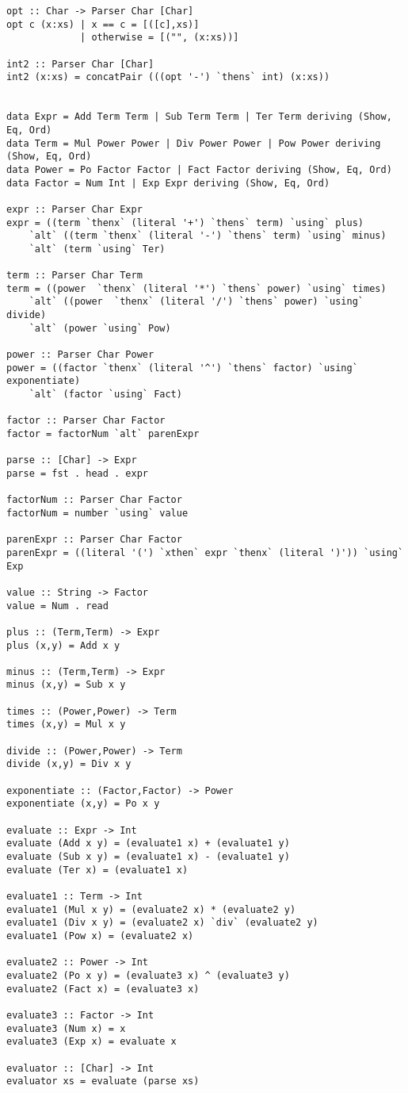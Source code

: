 \documentclass[11pt]{article}
\begin{document}
\begin{verbatim}
opt :: Char -> Parser Char [Char]
opt c (x:xs) | x == c = [([c],xs)]
             | otherwise = [("", (x:xs))]

int2 :: Parser Char [Char]
int2 (x:xs) = concatPair (((opt '-') `thens` int) (x:xs))


data Expr = Add Term Term | Sub Term Term | Ter Term deriving (Show, Eq, Ord)
data Term = Mul Power Power | Div Power Power | Pow Power deriving (Show, Eq, Ord)
data Power = Po Factor Factor | Fact Factor deriving (Show, Eq, Ord)
data Factor = Num Int | Exp Expr deriving (Show, Eq, Ord)

expr :: Parser Char Expr
expr = ((term `thenx` (literal '+') `thens` term) `using` plus) 
    `alt` ((term `thenx` (literal '-') `thens` term) `using` minus) 
    `alt` (term `using` Ter) 

term :: Parser Char Term
term = ((power  `thenx` (literal '*') `thens` power) `using` times) 
    `alt` ((power  `thenx` (literal '/') `thens` power) `using` divide) 
    `alt` (power `using` Pow)

power :: Parser Char Power
power = ((factor `thenx` (literal '^') `thens` factor) `using` exponentiate)
    `alt` (factor `using` Fact)

factor :: Parser Char Factor
factor = factorNum `alt` parenExpr

parse :: [Char] -> Expr
parse = fst . head . expr

factorNum :: Parser Char Factor
factorNum = number `using` value

parenExpr :: Parser Char Factor
parenExpr = ((literal '(') `xthen` expr `thenx` (literal ')')) `using` Exp

value :: String -> Factor
value = Num . read

plus :: (Term,Term) -> Expr
plus (x,y) = Add x y

minus :: (Term,Term) -> Expr
minus (x,y) = Sub x y

times :: (Power,Power) -> Term
times (x,y) = Mul x y

divide :: (Power,Power) -> Term
divide (x,y) = Div x y

exponentiate :: (Factor,Factor) -> Power
exponentiate (x,y) = Po x y

evaluate :: Expr -> Int
evaluate (Add x y) = (evaluate1 x) + (evaluate1 y)
evaluate (Sub x y) = (evaluate1 x) - (evaluate1 y)
evaluate (Ter x) = (evaluate1 x)

evaluate1 :: Term -> Int
evaluate1 (Mul x y) = (evaluate2 x) * (evaluate2 y)
evaluate1 (Div x y) = (evaluate2 x) `div` (evaluate2 y)
evaluate1 (Pow x) = (evaluate2 x)

evaluate2 :: Power -> Int
evaluate2 (Po x y) = (evaluate3 x) ^ (evaluate3 y)
evaluate2 (Fact x) = (evaluate3 x)

evaluate3 :: Factor -> Int
evaluate3 (Num x) = x
evaluate3 (Exp x) = evaluate x

evaluator :: [Char] -> Int
evaluator xs = evaluate (parse xs)

\end{verbatim}
\end{document}
